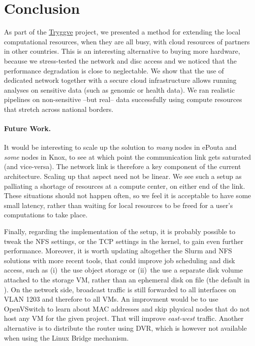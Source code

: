 \section{Conclusion}
\label{section:conclusion}

As part of the \href{https://wiki.neic.no/wiki/Tryggve}{Tryggve}
project, we presented a method for extending the local computational
resources, when they are all busy, with cloud resources of partners in
other countries.
%
This is an interesting alternative to buying more hardware, because we
stress-tested the network and disc access and we noticed that the
performance degradation is close to neglectable.
%
We show that the use of dedicated network together with a secure cloud
infrastructure allows running analyses on sensitive data (such as
genomic or health data).
%
We ran realistic pipelines on non-sensitive --but real-- data
successfully using compute resources that stretch across national
borders.
%

\paragraph{Future Work.}
%
It would be interesting to scale up the solution to \emph{many} nodes
in ePouta and \emph{some} nodes in Knox, to see
at which point the communication link gets saturated (and vice-versa).
%
The network link is therefore a key component of the current
architecture.
%
Scaling up that aspect need not be linear. We see such a setup as
palliating a shortage of resources at a compute center, on either end
of the link. These situations should not happen often, so we feel it
is acceptable to have some small latency, rather than waiting for
local resources to be freed for a user's computations to take place.

%
Finally, regarding the implementation of the setup,
%
it is probably possible to tweak the NFS settings, or the TCP settings
in the kernel, to gain even further performance.
%
Moreover, it is worth updating altogether the Slurm and NFS solutions
with more recent tools, that could improve job scheduling and disk
access, such as (i)~the use object storage or (ii)~the use a separate
disk volume attached to the storage VM, rather than an ephemeral disk
on file (\ie the default in ).
%
On the network side, broadcast traffic is still forwarded to all
interfaces on VLAN 1203 and therefore to all VMs. An improvment would
be to use OpenVSwitch to learn about MAC addresses and skip physical
nodes that do not host any VM for the given project. That will improve
\emph{east-west} traffic. Another alternative is to distribute the
router using DVR, which is however not available when using the Linux
Bridge mechanism.

